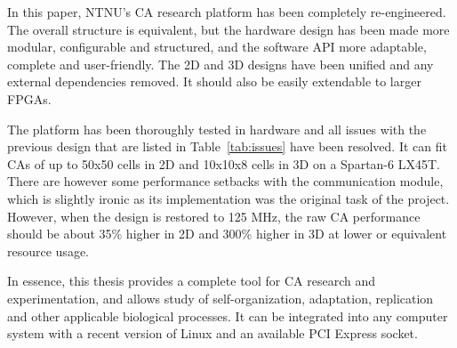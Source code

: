 In this paper, NTNU's CA research platform has been completely re-engineered.
The overall structure is equivalent, but the hardware design has been made more modular, configurable and structured, and the software API more adaptable, complete and user-friendly.
The 2D and 3D designs have been unified and any external dependencies removed.
It should also be easily extendable to larger FPGAs.

The platform has been thoroughly tested in hardware and all issues with the previous design that are listed in Table~\ref{tab:issues} have been resolved.
It can fit CAs of up to 50x50 cells in 2D and 10x10x8 cells in 3D on a Spartan-6 LX45T.
There are however some performance setbacks with the communication module, which is slightly ironic as its implementation was the original task of the project.
However, when the design is restored to 125 MHz, the raw CA performance should be about 35\% higher in 2D and 300\% higher in 3D at lower or equivalent resource usage.

In essence, this thesis provides a complete tool for CA research and experimentation, and allows study of self-organization, adaptation, replication and other applicable biological processes.
It can be integrated into any computer system with a recent version of Linux and an available PCI Express socket.
